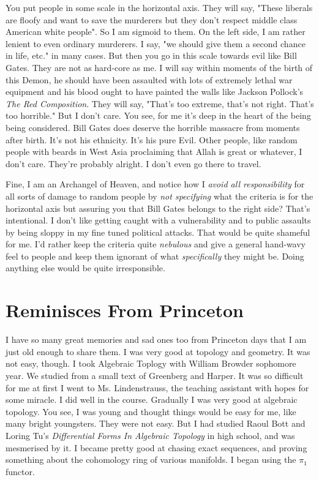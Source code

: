 \documentclass{amsart}
\begin{document}
You put people in some scale in the horizontal axis.  They will say, "These liberals are floofy and want to save the murderers but they don't respect middle class American white people".  So I am sigmoid to them.  On the left side, I am rather lenient to even ordinary murderers.  I say, "we should give them a second chance in life, etc." in many cases.  But then you go in this scale towards evil like Bill Gates. They are not as hard-core as me. I will say within moments of the birth of this Demon, he should have been assaulted with lots of extremely lethal war equipment and his blood ought to have painted the walls like Jackson Pollock's {\em The Red Composition}.  They will say, "That's too extreme, that's not right.  That's too horrible."  But I don't care.  You see, for me it's deep in the heart of the being being considered.  Bill Gates does deserve the horrible massacre from moments after birth.  It's not his ethnicity.  It's his pure Evil.  Other people, like random people with beards in West Asia proclaiming that Allah is great or whatever, I don't care.  They're probably alright.  I don't even go there to travel.

Fine, I am an Archangel of Heaven, and notice how I {\em avoid all responsibility} for all sorts of damage to random people by {\em not specifying} what the criteria is for the horizontal axis but assuring you that Bill Gates belongs to the right side?  That's intentional.  I don't like getting caught with a vulnerability and to public assaults by being sloppy in my fine tuned political attacks.  That would be quite shameful for me. I'd rather keep the criteria quite {\em nebulous} and give a general hand-wavy feel to people and keep them ignorant of what {\em specifically} they might be.  Doing anything else would be quite irresponsible.


 
\section{Reminisces From Princeton}

I have so many great memories and sad ones too from Princeton days that I am just old enough to share them.  I was very good at topology and geometry.  It was not easy, though.  I took Algebraic Toplogy with William Browder sophomore year.  We studied from a small text of Greenberg and Harper.  It was so difficult for me at first I went to Ms. Lindenstrauss, the teaching assistant with hopes for some miracle.  I did well in the course. Gradually I was very good at algebraic topology.  You see, I was young and thought things would be easy for me, like many bright youngsters.  They were not easy.  But I had studied Raoul Bott and Loring Tu's {\em Differential Forms In Algebraic Topology} in high school, and was mesmerised by it.  I became pretty good at chasing exact sequences, and proving something about the cohomology ring of various manifolds.  I began using the $\pi_1$ functor.
\end{document}
